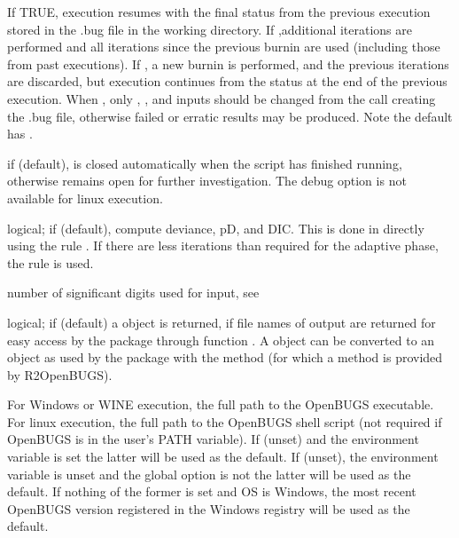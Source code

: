 \begin{Arguments}
\begin{ldescription}
\item[\code{restart}] If TRUE, execution resumes with the final status from
the previous execution stored in the .bug file in the working directory.
If ,additional iterations are performed and all iterations since
the previous burnin are used (including those from past executions).  If
, a new burnin is performed, and the previous iterations are
discarded, but execution continues from the status at the end of the previous
execution.  When , only , ,
and  inputs
should be changed from the call creating the .bug file, otherwise
failed or erratic results may be produced.  Note the default has .

\item[\code{debug}] if  (default),  is closed automatically
when the script has finished running, otherwise  remains open
for further investigation.  The debug option is not available for linux execution.
\item[\code{DIC}] logical; if  (default), compute deviance, pD,
and DIC. This is done in  directly using the rule .  If there are less iterations than required for the
adaptive phase, the rule  is used.
\item[\code{digits}] number of significant digits used for  input, see
\item[\code{codaPkg}] logical; if  (default) a  object
is returned, if  file names of  output are
returned for easy access by the  package through function
.
A  object can be converted to an  object as
used by the  package with the method 
(for which a method is provided by R2OpenBUGS).
\item[\code{OpenBUGS.pgm}]  For Windows or WINE execution, the full path to the OpenBUGS
executable.  For linux execution, the full path to the OpenBUGS shell script (not
required if OpenBUGS is in the user's PATH variable).
If  (unset) and the environment variable  is set the latter will be used as the default.
If  (unset), the environment variable  is unset and the global option  is not  the latter will be used as the default.
If nothing of the former is set and OS is Windows, the most recent OpenBUGS version
registered in the Windows registry  will be used as the default.


\end{ldescription}
\end{Arguments}
